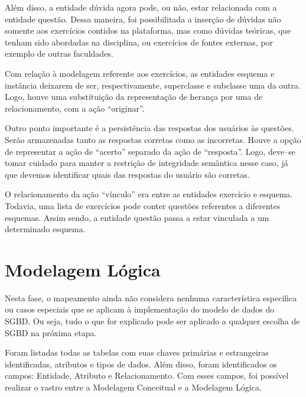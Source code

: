 \documentclass[graduacao,brazil]{ThesisPUC}
\begin{document}
Al\'{e}m disso, a entidade d\'{u}vida agora pode, ou n\~{a}o, estar relacionada com a
entidade quest\~{a}o. Dessa maneira, foi possibilitada a inser\c{c}\~{a}o de d\'{u}vidas n\~{a}o somente aos
exerc\'{i}cios contidos na plataforma, mas como d\'{u}vidas te\'{o}ricas, que tenham sido abordadas na
disciplina, ou exerc\'{i}cios de fontes externas, por exemplo de outras faculdades.

Com rela\c{c}\~{a}o \`{a} modelagem referente aos exerc\'{i}cios, as entidades esquema e inst\^{a}ncia
deixarem de ser, respectivamente, superclasse e subclasse uma da outra. Logo, houve uma
substitui\c{c}\~{a}o da representa\c{c}\~{a}o de heran\c{c}a por uma de relacionamento, com a a\c{c}\~{a}o “originar”.

Outro ponto importante \'{e} a persist\^{e}ncia das respostas dos usu\'{a}rios \`{a}s quest\~{o}es. Ser\~{a}o
armazenadas tanto as respostas corretas como as incorretas. Houve a op\c{c}\~{a}o de representar a
a\c{c}\~{a}o de “acerto” separado da a\c{c}\~{a}o de “resposta”. Logo, deve--se tomar cuidado para manter a
restri\c{c}\~{a}o de integridade sem\^{a}ntica nesse caso, j\'{a} que devemos identificar quais das respostas do
usu\'{a}rio s\~{a}o corretas.

O relacionamento da a\c{c}\~{a}o “v\'{i}nculo” era entre as entidades exerc\'{i}cio e
esquema. Todavia, uma lista de exerc\'{i}cios pode conter quest\~{o}es referentes a diferentes
esquemas. Assim sendo, a entidade quest\~{a}o passa a estar vinculada a um determinado esquema.


\section{Modelagem L\'{o}gica}

Nesta fase, o mapeamento ainda n\~{a}o considera nenhuma caracter\'{i}stica espec\'{i}fica ou
casos especiais que se aplicam \`{a} implementa\c{c}\~{a}o do modelo de dados do SGBD. Ou seja, tudo
o que for explicado pode ser aplicado a qualquer escolha de SGBD na pr\'{o}xima etapa.

Foram listadas todas as tabelas com suas chaves prim\'{a}rias e estrangeiras
identificadas, atributos e tipos de dados. Al\'{e}m disso, foram identificados os campos: Entidade,
Atributo e Relacionamento. Com esses campos, foi poss\'{i}vel realizar o rastro entre a Modelagem
Conceitual e a Modelagem L\'{o}gica.
\end{document}
